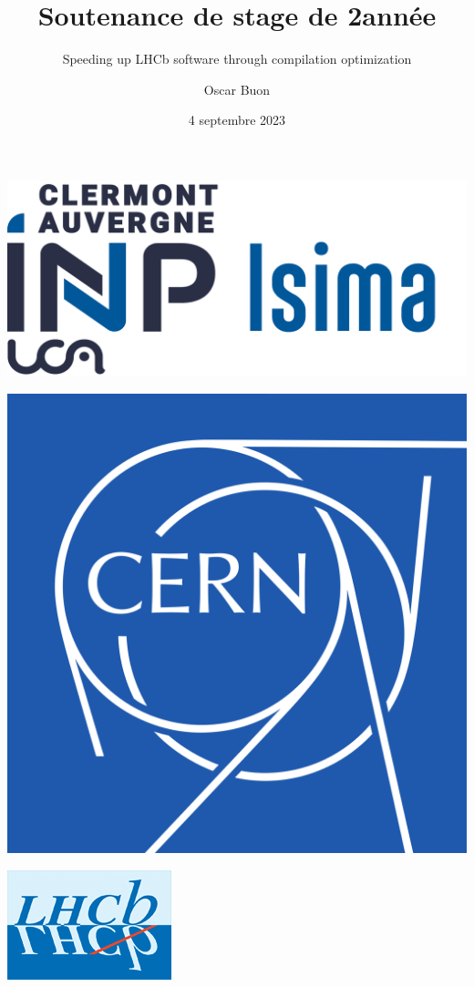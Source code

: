 \documentclass{beamer}
\title{Soutenance de stage de 2\ieme année}
\subtitle{Speeding up LHCb software through compilation optimization}
\author{Oscar Buon}
\date{4 septembre 2023}
\begin{document}
\begin{frame}
    \centering
    \begin{minipage}{0.2\textwidth}
        \includegraphics[width=\textwidth]{logo_ISIMA_INP.png}
    \end{minipage}\hfill
    \begin{minipage}{0.2\textwidth}
        \includegraphics[width=\textwidth]{logo_CERN.png}
    \end{minipage}\hfill
    \begin{minipage}{0.2\textwidth}
        \includegraphics[width=\textwidth]{logo_LHCb.png}
    \end{minipage}


\end{frame}
\end{document}
